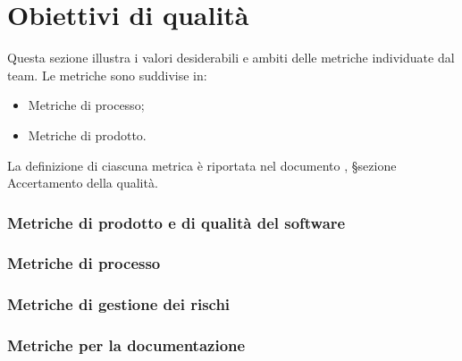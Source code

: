 \section{Obiettivi di qualità}

\par Questa sezione illustra i valori desiderabili e ambiti delle metriche individuate dal team. Le metriche sono suddivise in:
\begin{itemize}
  \item Metriche di processo;
  \item Metriche di prodotto.
\end{itemize}

\par La definizione di ciascuna metrica è riportata nel documento \NormeDiProgetto, §sezione Accertamento della qualità.

\subsubsection{Metriche di prodotto e di qualità del software}


\subsubsection{Metriche di processo}


\subsubsection{Metriche di gestione dei rischi}


\subsubsection{Metriche per la documentazione}

